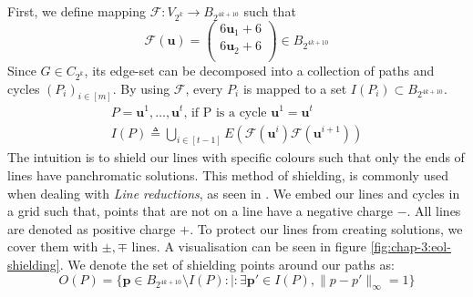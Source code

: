 First, we define mapping $\mathcal{F}: V_{2^k} \to B_{2^{4k+10}}$ such that
$$
    \mathcal{F}(\mathbf{u}) = \begin{pmatrix}
        6 \mathbf{u}_{1} + 6 \\
        6 \mathbf{u}_{2} + 6 \\
    \end{pmatrix} \in B_{2^{4k+10}}
$$
Since $G \in C_{2^k}$, its edge-set can be decomposed into a collection of paths and cycles $(P_{i})_{i \in [m]}$.
By using $\mathcal{F}$, every $P_{i}$ is mapped to a set $I(P_{i}) \subset B_{2^{4k+10}}$.
\begin{gather*}
    P = \mathbf{u}^1,\dots,\mathbf{u}^t \text{, if P is a cycle } \mathbf{u}^1 = \mathbf{u}^t \\
    I(P) \triangleq \bigcup_{i \in [t-1]} E(\mathcal{F}(\mathbf{u}^i)\mathcal{F}(\mathbf{u}^{i +1}))
\end{gather*}
The intuition is to shield our lines with specific colours such that only the ends of lines have panchromatic solutions.
This method of shielding, is commonly used when dealing with \textit{Line reductions}, as seen in
\cite{chen_Complexity2DDiscrete_2009,deligkas_ConstantInapproximabilityPPA_2022,aisenberg_2DTuckerPPA_2020,chen_SettlingComplexityComputing_2009,daskalakis_ComplexityComputingNash_2006}.
We embed our lines and cycles in a grid such that, points that are not on a line have a negative charge $-$.
All lines are denoted as positive charge $+$. To protect our lines from creating solutions, we cover them
with $\pm, \mp$ lines. A visualisation can be seen in figure \ref{fig:chap-3:eol-shielding}.
We denote the set of shielding points around our paths as:
$$
    O(P) = \{  \mathbf{p} \in B_{2^{4k+10}} \setminus I(P) :\mid: \exists \mathbf{p}' \in I(P), \|p- p'\|_{\infty} = 1 \}
$$

